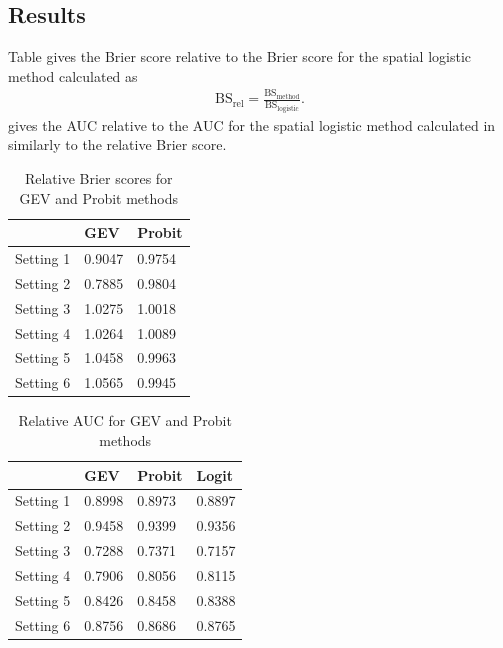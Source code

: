 \documentclass[11pt]{article}
\begin{document}
\subsection{Results}
Table  gives the Brier score relative to the Brier score for the spatial logistic method calculated as
\begin{align}
  \text{BS}_{\text{rel}} = \frac{\text{BS}_{\text{method}}}{\text{BS}_{\text{logistic}}}.
\end{align}
 gives the AUC relative to the AUC for the spatial logistic method calculated in similarly to the relative Brier score.

\begin{table}
  \caption{Relative Brier scores for GEV and Probit methods}
  \label{rbtbl:simbsresults}
  \centering
  \begin{tabular}{r|ll}
    \cline{2-3}
              & GEV    & Probit\\
    \hline
    Setting 1 & 0.9047 & 0.9754\\
    Setting 2 & 0.7885 & 0.9804\\
    Setting 3 & 1.0275 & 1.0018\\
    Setting 4 & 1.0264 & 1.0089\\
    Setting 5 & 1.0458 & 0.9963\\
    Setting 6 & 1.0565 & 0.9945\\
    \hline
  \end{tabular}
\end{table}

\begin{table}
  \caption{Relative AUC for GEV and Probit methods}
  \label{rbtbl:simaucresults}
  \centering
  \begin{tabular}{r|lll}
    \cline{2-4}
              & GEV    & Probit & Logit\\
    \hline
    Setting 1 & 0.8998 & 0.8973 & 0.8897\\
    Setting 2 & 0.9458 & 0.9399 & 0.9356\\
    Setting 3 & 0.7288 & 0.7371 & 0.7157\\
    Setting 4 & 0.7906 & 0.8056 & 0.8115\\
    Setting 5 & 0.8426 & 0.8458 & 0.8388\\
    Setting 6 & 0.8756 & 0.8686 & 0.8765\\
    \hline
  \end{tabular}
\end{table}
\end{document}
